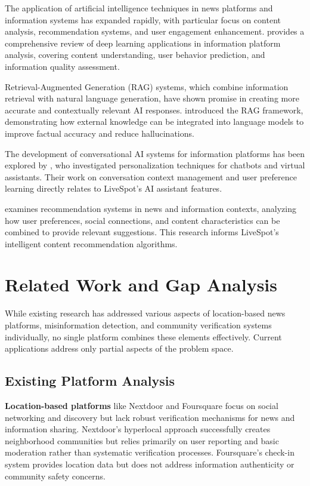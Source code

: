 The application of artificial intelligence techniques in news platforms and information systems has expanded rapidly, with particular focus on content analysis, recommendation systems, and user engagement enhancement. \cite{zhang2019deep} provides a comprehensive review of deep learning applications in information platform analysis, covering content understanding, user behavior prediction, and information quality assessment.

Retrieval-Augmented Generation (RAG) systems, which combine information retrieval with natural language generation, have shown promise in creating more accurate and contextually relevant AI responses. \cite{lewis2020retrieval} introduced the RAG framework, demonstrating how external knowledge can be integrated into language models to improve factual accuracy and reduce hallucinations.

The development of conversational AI systems for information platforms has been explored by \cite{zhang2018personalizing}, who investigated personalization techniques for chatbots and virtual assistants. Their work on conversation context management and user preference learning directly relates to LiveSpot's AI assistant features.

\cite{riedl2013recommender} examines recommendation systems in news and information contexts, analyzing how user preferences, social connections, and content characteristics can be combined to provide relevant suggestions. This research informs LiveSpot's intelligent content recommendation algorithms.

\section{Related Work and Gap Analysis}
\label{sec:related_work_gaps}

While existing research has addressed various aspects of location-based news platforms, misinformation detection, and community verification systems individually, no single platform combines these elements effectively. Current applications address only partial aspects of the problem space.

\subsection{Existing Platform Analysis}
\label{subsec:platform_analysis}

\textbf{Location-based platforms} like Nextdoor and Foursquare focus on social networking and discovery but lack robust verification mechanisms for news and information sharing. Nextdoor's hyperlocal approach successfully creates neighborhood communities but relies primarily on user reporting and basic moderation rather than systematic verification processes. Foursquare's check-in system provides location data but does not address information authenticity or community safety concerns.

